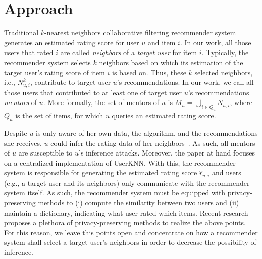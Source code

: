 \documentclass[manuscript,review,anonymous]{acmart}
\begin{document}
\section{Approach}
Traditional $k$-nearest neighbors collaborative filtering recommender system generates an estimated rating score for user $u$ and item $i$.
In our work, all those users that rated $i$ are called \emph{neighbors} of a \emph{target user} for item $i$.
Typically, the recommender system selects $k$ neighbors based on which its estimation of the target user's rating score of item $i$ is based on.
Thus, these $k$ selected neighbors, i.e., $N^k_{u, i}$, contribute to target user $u$'s recommendations.
In our work, we call all those users that contributed to at least one of target user $u$'s recommendations \emph{mentors} of $u$.
More formally, the set of mentors of $u$ is $M_u = \bigcup_{i \in Q_u} N_{u, i}$, where $Q_u$ is the set of items, for which $u$ queries an estimated rating score.

Despite $u$ is only aware of her own data, the algorithm, and the recommendations she receives, $u$ could infer the rating data of her neighbors~\cite{calandrino2011you,ramakrishnan2001being}.
As such, all mentors of $u$ are susceptible to $u$'s inference attacks.
Moreover, the paper at hand focuses on a centralized implementation of UserKNN.
With this, the recommender system is responsible for generating the estimated rating score $\hat{r}_{u, i}$ and users (e.g., a target user and its neighbors) only communicate with the recommender system itself.
As such, the recommender system must be equipped with privacy-preserving methods to (i) compute the similarity between two users and (ii) maintain a dictionary, indicating what user rated which items.
Recent research proposes a plethora of privacy-preserving methods to realize the above points.
For this reason, we leave this points open and concentrate on how a recommender system shall select a target user's neighbors in order to decrease the possibility of inference.
\end{document}
